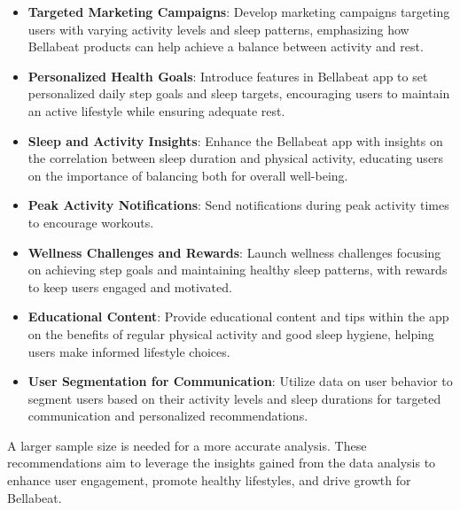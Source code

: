 \documentclass[
]{article}
\begin{document}
\begin{itemize}
\item
  \textbf{Targeted Marketing Campaigns}: Develop marketing campaigns
  targeting users with varying activity levels and sleep patterns,
  emphasizing how Bellabeat products can help achieve a balance between
  activity and rest.
\item
  \textbf{Personalized Health Goals}: Introduce features in Bellabeat
  app to set personalized daily step goals and sleep targets,
  encouraging users to maintain an active lifestyle while ensuring
  adequate rest.
\item
  \textbf{Sleep and Activity Insights}: Enhance the Bellabeat app with
  insights on the correlation between sleep duration and physical
  activity, educating users on the importance of balancing both for
  overall well-being.
\item
  \textbf{Peak Activity Notifications}: Send notifications during peak
  activity times to encourage workouts.
\item
  \textbf{Wellness Challenges and Rewards}: Launch wellness challenges
  focusing on achieving step goals and maintaining healthy sleep
  patterns, with rewards to keep users engaged and motivated.
\item
  \textbf{Educational Content}: Provide educational content and tips
  within the app on the benefits of regular physical activity and good
  sleep hygiene, helping users make informed lifestyle choices.
\item
  \textbf{User Segmentation for Communication}: Utilize data on user
  behavior to segment users based on their activity levels and sleep
  durations for targeted communication and personalized recommendations.
\end{itemize}

A larger sample size is needed for a more accurate analysis. These
recommendations aim to leverage the insights gained from the data
analysis to enhance user engagement, promote healthy lifestyles, and
drive growth for Bellabeat.
\end{document}
